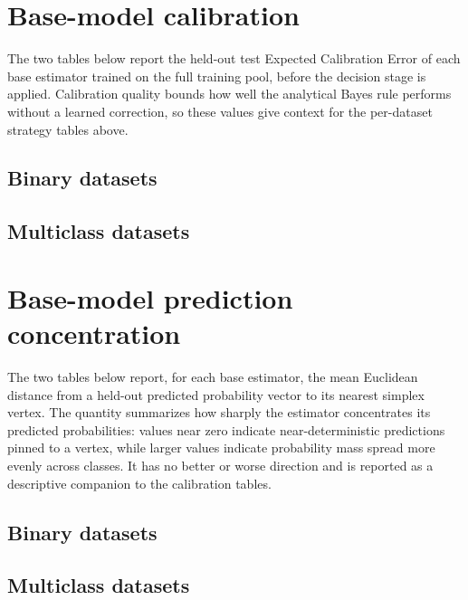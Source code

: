 \documentclass[a4paper,12pt,twoside,brazilian,english]{article}
\begin{document}
\begin{landscape}
\section{Base-model calibration}\label{app:model-ece}

The two tables below report the held-out test Expected Calibration
Error of each base estimator trained on the full training pool, before
the decision stage is applied. Calibration quality bounds how well the
analytical Bayes rule performs without a learned correction, so these
values give context for the per-dataset strategy tables above.

\subsection{Binary datasets}


\subsection{Multiclass datasets}


\section{Base-model prediction concentration}\label{app:model-vertex}

The two tables below report, for each base estimator, the mean
Euclidean distance from a held-out predicted probability vector to its
nearest simplex vertex. The quantity summarizes how sharply the
estimator concentrates its predicted probabilities: values near zero
indicate near-deterministic predictions pinned to a vertex, while
larger values indicate probability mass spread more evenly across
classes. It has no better or worse direction and is reported as a
descriptive companion to the calibration tables.

\subsection{Binary datasets}


\subsection{Multiclass datasets}


\end{landscape}
\end{document}
